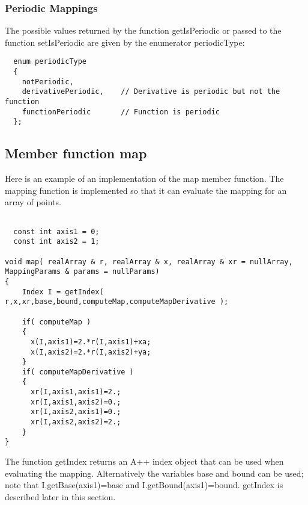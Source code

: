 \documentclass[xcolor=rgb,svgnames,dvipsnames]{article}
\newcommand{\Index}[1]{#1\index{#1}}
\begin{document}


\subsubsection{Periodic Mappings}
  The possible values returned by the function {\ff getIsPeriodic} or passed to
the function {\ff setIsPeriodic} are given by the enumerator {\ff periodicType}:
{\footnotesize
\begin{verbatim}
  enum periodicType
  {
    notPeriodic,
    derivativePeriodic,    // Derivative is periodic but not the function
    functionPeriodic       // Function is periodic
  };
\end{verbatim}
}

\subsection{Member function {\ff map}}

Here is an example of an implementation of the {\ff \Index{map}} member
function. The mapping function is implemented  so that it can evaluate
the mapping for an array of points.
{\footnotesize
\begin{verbatim}

  const int axis1 = 0;
  const int axis2 = 1;

void map( realArray & r, realArray & x, realArray & xr = nullArray, MappingParams & params = nullParams)
{
    Index I = getIndex( r,x,xr,base,bound,computeMap,computeMapDerivative );

    if( computeMap )
    {
      x(I,axis1)=2.*r(I,axis1)+xa; 
      x(I,axis2)=2.*r(I,axis2)+ya;
    }
    if( computeMapDerivative )
    { 
      xr(I,axis1,axis1)=2.;         
      xr(I,axis1,axis2)=0.;  
      xr(I,axis2,axis1)=0.;
      xr(I,axis2,axis2)=2.;
    }
}
\end{verbatim}
}
The function {\ff getIndex} returns an A++ index object that can be used when
evaluating the mapping. Alternatively the variables {\ff base} and {\ff bound}
can be used; note that {\ff I.getBase(axis1)=base} and {I.getBound(axis1)=bound}.
{\ff getIndex} is described later in this section. 
\end{document}
